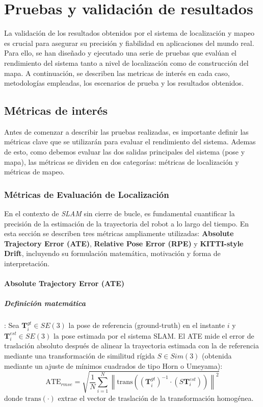 \documentclass[12pt, a4paper, twoside]{article}
\begin{document}
\section{Pruebas y validación de resultados}
La validación de los resultados obtenidos por el sistema de localización y mapeo es crucial para asegurar su precisión y fiabilidad en aplicaciones del mundo real. Para ello, se han diseñado y 
ejecutado una serie de pruebas que evalúan el rendimiento del sistema tanto a nivel de localización como de construcción del mapa. A continuación, se describen las metricas de interés en cada caso, 
metodologías empleadas, los escenarios de prueba y los resultados obtenidos.\newline

\subsection{Métricas de interés}
Antes de comenzar a describir las pruebas realizadas, es importante definir las métricas clave que se utilizarán para evaluar el rendimiento del sistema. Ademas de esto, como debemos evaluar las dos 
salidas principales del sistema (pose y mapa), las métricas se dividen en dos categorías: métricas de localización y métricas de mapeo.

\subsubsection{Métricas de Evaluación de Localización}

En el contexto de \textit{SLAM} sin cierre de bucle, es fundamental cuantificar 
la precisión de la estimación de la trayectoria del robot a lo largo del tiempo. 
En esta sección se describen tres métricas ampliamente utilizadas: 
\textbf{Absolute Trajectory Error (ATE)}, 
\textbf{Relative Pose Error (RPE)} y 
\textbf{KITTI-style Drift}, incluyendo su formulación matemática, motivación y forma de interpretación.

\paragraph{Absolute Trajectory Error (ATE)}

\subparagraph{Definición matemática}:
Sea $\mathbf{T}^{gt}_i \in SE(3)$ la pose de referencia (ground-truth) en el instante $i$ 
y $\mathbf{T}^{est}_i \in SE(3)$ la pose estimada por el sistema SLAM.
El ATE mide el error de traslación absoluto después de alinear la trayectoria estimada 
con la de referencia mediante una transformación de similitud rígida $S \in Sim(3)$
(obtenida mediante un ajuste de mínimos cuadrados de tipo Horn o Umeyama):
\[
\text{ATE}_{rmse} = 
\sqrt{\frac{1}{N}\sum_{i=1}^{N} 
\left\| 
\mathrm{trans}\!\left(
(\mathbf{T}^{gt}_i)^{-1} \cdot (S \mathbf{T}^{est}_i)
\right)
\right\|^2 }
\]
donde $\mathrm{trans}(\cdot)$ extrae el vector de traslación de la transformación homogénea.
\end{document}
